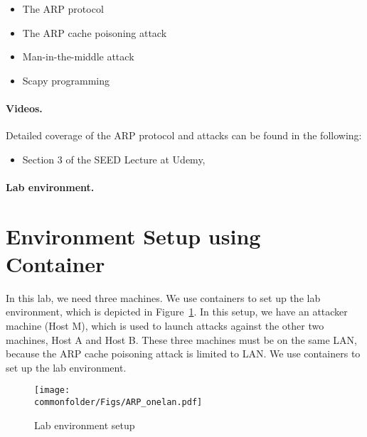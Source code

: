 \begin{itemize}[noitemsep]
\item The ARP protocol
\item The ARP cache poisoning attack
\item Man-in-the-middle attack
\item Scapy programming
\end{itemize}
 


\paragraph{Videos.}
Detailed coverage of the ARP protocol and attacks can be found in the following:

\begin{itemize}
\item Section 3 of the SEED Lecture at Udemy, \seedisvideo
\end{itemize}


\paragraph{Lab environment.} \seedenvironmentC




\section{Environment Setup using Container}

In this lab, we need three machines. We use 
containers to set up the lab environment, which is depicted 
in Figure~\ref{arp:fig:labsetup}.
In this setup, we have an attacker machine (Host M),
which is used to launch attacks against the other two machines, Host A and
Host B.  These three machines must be on the same LAN,
because the ARP cache poisoning attack is limited to LAN. We use 
containers to set up the lab environment.

\begin{figure}[htb]
\begin{center}
\texttt{[image: \\commonfolder/Figs/ARP\_onelan.pdf]}
\end{center}
\caption{Lab environment setup}
\label{arp:fig:labsetup}
\end{figure}
 


